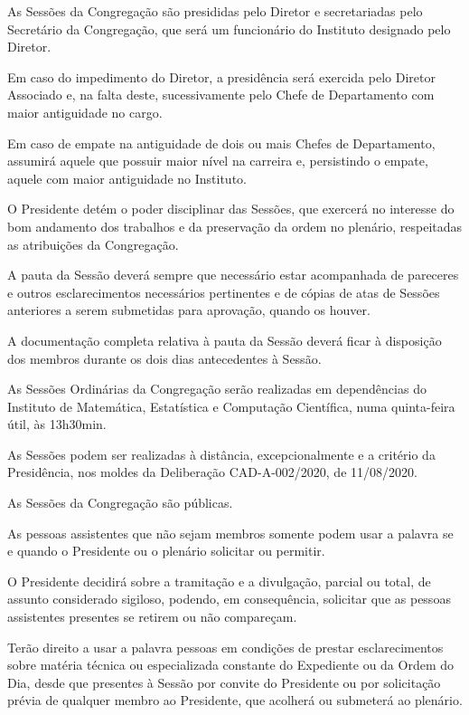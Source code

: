 \documentclass{documento}
\begin{document}
\artigo As Sessões da Congregação são presididas pelo Diretor e secretariadas pelo Secretário da Congregação, que será um funcionário do Instituto designado pelo Diretor.

\paragrafo Em caso do impedimento do Diretor, a presidência será exercida pelo Diretor Associado e, na falta deste, sucessivamente pelo Chefe de Departamento com maior antiguidade no cargo.

\paragrafo Em caso de empate na antiguidade de dois ou mais Chefes de Departamento, assumirá aquele que possuir maior nível na carreira e, persistindo o empate, aquele com maior antiguidade no Instituto.

\artigo O Presidente detém o poder disciplinar das Sessões, que exercerá no interesse do bom andamento dos trabalhos e da preservação da ordem no plenário, respeitadas as atribuições da Congregação.

\artigo A pauta da Sessão deverá sempre que necessário estar acompanhada de pareceres e outros esclarecimentos necessários pertinentes e de cópias de atas de Sessões anteriores a serem submetidas para aprovação, quando os houver.

\paragrafo A documentação completa relativa à pauta da Sessão deverá ficar à disposição dos membros durante os dois dias antecedentes à Sessão.

\paragrafo As Sessões Ordinárias da Congregação serão realizadas em dependências do Instituto de Matemática, Estatística e Computação Científica, numa quinta-feira útil, às 13h30min.

\paragrafo As Sessões podem ser realizadas à distância, excepcionalmente e a critério da Presidência, nos moldes da Deliberação CAD-A-002/2020, de 11/08/2020.

\artigo As Sessões da Congregação são públicas.

\paragrafo As pessoas assistentes que não sejam membros somente podem usar a palavra se e quando o Presidente ou o plenário solicitar ou permitir.

\paragrafo O Presidente decidirá sobre a tramitação e a divulgação, parcial ou total, de assunto considerado sigiloso, podendo, em consequência, solicitar que as pessoas assistentes presentes se retirem ou não compareçam.

\paragrafo Terão direito a usar a palavra pessoas em condições de prestar esclarecimentos sobre matéria técnica ou especializada constante do Expediente ou da Ordem do Dia, desde que presentes à Sessão por convite do Presidente ou por solicitação prévia de qualquer membro ao Presidente, que acolherá ou submeterá ao plenário.
\end{document}
